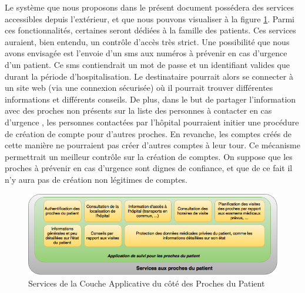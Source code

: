 Le système que nous proposons dans le présent document possédera des services accessibles depuis l'extérieur, et que nous pouvons visualiser à la figure \ref{famille}. Parmi ces
fonctionnalités, certaines seront dédiées à la famille des patients. Ces services auraient, bien entendu, un contrôle d'accès très
strict. Une possibilité que nous avons envisagée est l'envoie d'un sms aux numéros à prévenir en cas d'urgence d'un patient. Ce
sms contiendrait un mot de passe et un identifiant valides que durant la période d'hospitalisation. Le destinataire pourrait alors
se connecter à un site web (via une connexion sécurisée) où il pourrait trouver différentes informations et différents conseils. 
De plus, dans le but de partager l'information avec des proches non présents sur la liste des personnes à contacter en cas d'urgence
, les personnes contactées par l'hôpital pourraient initier une procédure de création de compte pour d'autres proches. En revanche,
les comptes créés de cette manière ne pourraient pas créer d'autres comptes à leur tour. Ce mécanisme permettrait un meilleur contrôle
sur la création de comptes. On suppose que les proches à prévenir en cas d'urgence sont dignes de confiance, et que de ce fait
il n'y aura pas de création non légitimes de comptes.
\newline
\begin{figure}[h!]
	\hspace*{-2.5cm}
	\centering
	\includegraphics[width=1.4\textwidth]{famille.png}
	\caption{Services de la Couche Applicative du côté des Proches du Patient}
	\label{famille}
\end{figure}

